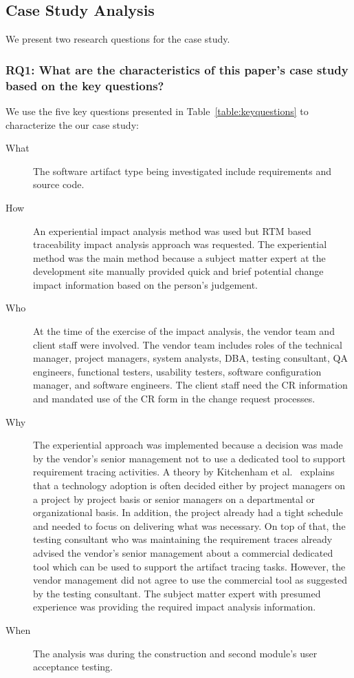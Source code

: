 \documentclass[conference]{IEEEtran}
\begin{document}
\subsection{Case Study Analysis}

We present two research questions for the case study.

\subsubsection{RQ1: What are the characteristics of this paper's case
  study based on the key questions?}

We use the five key questions presented in
Table~\ref{table:keyquestions} to characterize the our case study:

\begin{description}
\item[What] The software artifact type being investigated include
  requirements and source code.
\item[How] An experiential impact analysis method was used but RTM
  based traceability impact analysis approach was requested. The
  experiential method was the main method because a subject matter
  expert at the development site manually provided quick and brief
  potential change impact information based on the person's judgement.

\item[Who] At the time of the exercise of the impact analysis, the
  vendor team and client staff were involved. The vendor team includes
  roles of the technical manager, project managers, system analysts,
  DBA, testing consultant, QA engineers, functional testers, usability
  testers, software configuration manager, and software engineers. The
  client staff need the CR information and mandated use of the CR form
  in the change request processes.

\item[Why] The experiential approach was implemented because a
  decision was made by the vendor's senior management not to use a
  dedicated tool to support requirement tracing activities. A theory
  by Kitchenham et al.~\cite{kitchenham2004evidence} explains that a
  technology adoption is often decided either by project managers on a
  project by project basis or senior managers on a departmental or
  organizational basis. In addition, the project already had a tight
  schedule and needed to focus on delivering what was necessary. On
  top of that, the testing consultant who was maintaining the
  requirement traces already advised the vendor's senior management
  about a commercial dedicated tool which can be used to support the
  artifact tracing tasks. However, the vendor management did not agree
  to use the commercial tool as suggested by the testing
  consultant. The subject matter expert with presumed experience was
  providing the required impact analysis information.

\item[When] The analysis was during the construction and second
  module's user acceptance testing.
\end{description}
\end{document}
